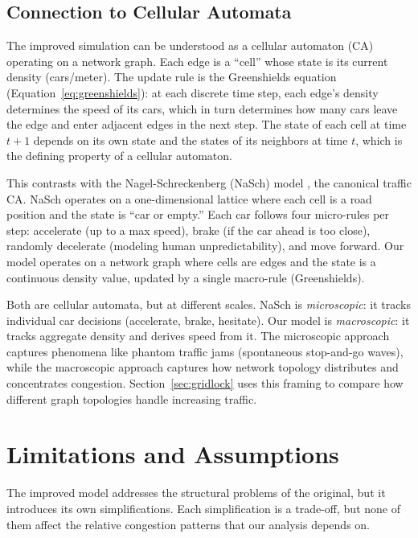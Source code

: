 \documentclass[12pt]{article}
\begin{document}
\subsection{Connection to Cellular Automata}

The improved simulation can be understood as a cellular automaton (CA) operating on a network graph. Each edge is a ``cell'' whose state is its current density (cars/meter). The update rule is the Greenshields equation (Equation~\ref{eq:greenshields}): at each discrete time step, each edge's density determines the speed of its cars, which in turn determines how many cars leave the edge and enter adjacent edges in the next step. The state of each cell at time $t+1$ depends on its own state and the states of its neighbors at time $t$, which is the defining property of a cellular automaton.

This contrasts with the Nagel-Schreckenberg (NaSch) model \citep{nagel1992}, the canonical traffic CA. NaSch operates on a one-dimensional lattice where each cell is a road position and the state is ``car or empty.'' Each car follows four micro-rules per step: accelerate (up to a max speed), brake (if the car ahead is too close), randomly decelerate (modeling human unpredictability), and move forward. Our model operates on a network graph where cells are edges and the state is a continuous density value, updated by a single macro-rule (Greenshields).

Both are cellular automata, but at different scales. NaSch is \textit{microscopic}: it tracks individual car decisions (accelerate, brake, hesitate). Our model is \textit{macroscopic}: it tracks aggregate density and derives speed from it. The microscopic approach captures phenomena like phantom traffic jams (spontaneous stop-and-go waves), while the macroscopic approach captures how network topology distributes and concentrates congestion. Section~\ref{sec:gridlock} uses this framing to compare how different graph topologies handle increasing traffic.


\section{Limitations and Assumptions}

The improved model addresses the structural problems of the original, but it introduces its own simplifications. Each simplification is a trade-off, but none of them affect the relative congestion patterns that our analysis depends on.
\end{document}
